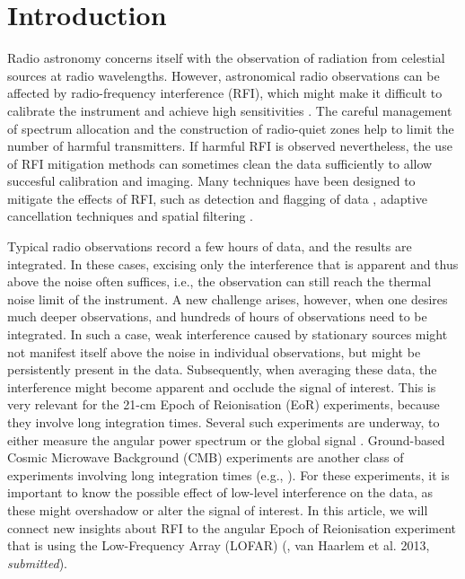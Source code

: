 \documentclass[useAMS,usenatbib]{mn2e}
\begin{document}
\section{Introduction}
Radio astronomy concerns itself with the observation of radiation from celestial sources at radio wavelengths. However, astronomical radio observations can be affected by radio-frequency interference (RFI), which might make it difficult to calibrate the instrument and achieve high sensitivities \citep{impact-of-warc79,interference-and-radioastronomy-1991,interference-model-lemmon,rfi-mitigation-overview-fridman-baan}. The careful management of spectrum allocation and the construction of radio-quiet zones help to limit the number of harmful transmitters. If harmful RFI is observed nevertheless, the use of RFI mitigation methods can sometimes clean the data sufficiently to allow succesful calibration and imaging. Many techniques have been designed to mitigate the effects of RFI, such as detection and flagging of data \citep{chi-square-time-blanking-weber, multichannel-rfi-mitigation, exoplanet-detection-with-rfi, wsrt-rfims, pulse-blanking, effelsberg-rfi-mitigation, post-correlation-rfi-classification}, adaptive cancellation techniques \citep{adaptive-cancellation,post-correlation-reference-signal} and spatial filtering \citep{multichannel-rfi-mitigation, ellingson-spatial-nulling-2002, hampson-spatial-nulling-2002, boonstra-dissertation, spatial-filtering-parkes-multibeam-for-pulses, post-correlation-filtering}. 

Typical radio observations record a few hours of data, and the results are integrated. In these cases, excising only the interference that is apparent and thus above the noise often suffices, i.e., the observation can still reach the thermal noise limit of the instrument. A new challenge arises, however, when one desires much deeper observations, and hundreds of hours of observations need to be integrated. In such a case, weak interference caused by stationary sources might not manifest itself above the noise in individual observations, but might be persistently present in the data. Subsequently, when averaging these data, the interference might become apparent and occlude the signal of interest. This is very relevant for the 21-cm Epoch of Reionisation (EoR) experiments, because they involve long integration times. Several such experiments are underway, to either measure the angular power spectrum \citep{gmrt-eor-2011-paciga,de-bruyn-eor-ursi-2011,eor-paper-2011-jacobs,eor-mwa-2012-williams} or the global signal \citep{edges}. Ground-based Cosmic Microwave Background (CMB) experiments are another class of experiments involving long integration times (e.g., \citealt{ska-cmb-subrahmanyan}). For these experiments, it is important to know the possible effect of low-level interference on the data, as these might overshadow or alter the signal of interest. In this article, we will connect new insights about RFI to the angular Epoch of Reionisation experiment that is using the Low-Frequency Array (LOFAR) (\citealt{de-bruyn-eor-ursi-2011}, van Haarlem et al. 2013, \textit{submitted}).
\nocite{lofar-overview-2013}
\end{document}
